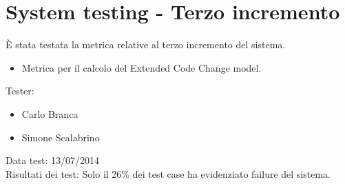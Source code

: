 \section{System testing - Terzo incremento}
È stata testata la metrica relative al terzo incremento del sistema.
\begin{itemize}
 \item Metrica per il calcolo del Extended Code Change model.
\end{itemize}
Tester:
\begin{itemize}
\item Carlo Branca
\item Simone Scalabrino
\end{itemize}
Data test: 13/07/2014\\
Risultati dei test: Solo il 26\% dei test case ha evidenziato failure del sistema.
